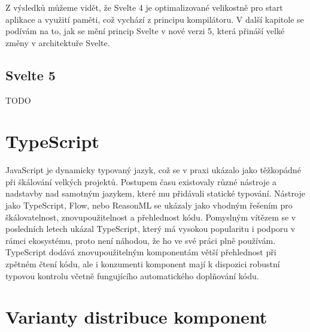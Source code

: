 Z výsledků můžeme vidět, že Svelte 4 je optimalizované velikostně pro start aplikace a využití paměti, což vychází z principu kompilátoru.
V další kapitole se podívám na to, jak se mění princip Svelte v nové verzi 5, která přináší velké změny v architektuře Svelte.

\subsection{Svelte 5}

TODO

\section{TypeScript}

JavaScript je dynamicky typovaný jazyk, což se v praxi ukázalo jako těžkopádné při škálování velkých projektů.
Postupem času existovaly různé nástroje a nadstavby nad samotným jazykem, které mu přidávali statické typování.
Nástroje jako TypeScript, Flow, nebo ReasonML se ukázaly jako vhodným řešením pro škálovatelnost, znovupoužitelnost a přehlednost kódu.
Pomyslným vítězem se v posledních letech ukázal TypeScript, který má vysokou popularitu i podporu v rámci ekosystému, proto není náhodou, že ho ve své práci plně používám.
TypeScript dodává znovupoužitelným komponentám větší přehlednost při zpětném čtení kódu, ale i konzumenti komponent mají k dispozici robustní typovou kontrolu včetně fungujícího automatického doplňování kódu.

\section{Varianty distribuce komponent}

